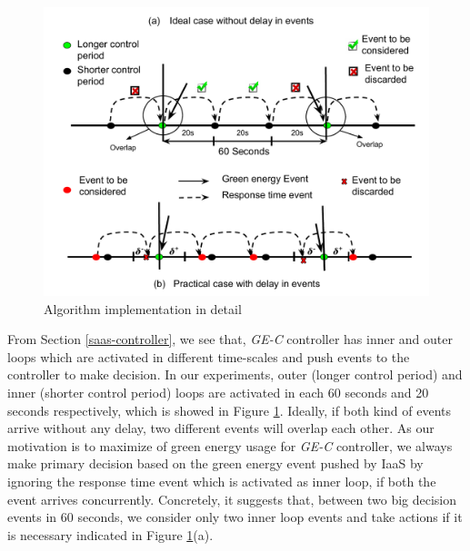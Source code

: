 \begin{figure} [htb]
\includegraphics[scale=.35]{Graphs/implementation_UCC.pdf}
\caption{Algorithm implementation in detail}
\label{fig:implementation} 
\end{figure}

From Section \ref{saas-controller}, we see that, \emph{GE-C} controller has inner and outer loops which are activated in different time-scales and push events to the controller to make decision. In our experiments, outer (longer control period) and inner (shorter control period) loops are activated in each 60 seconds and 20 seconds respectively, which is showed in Figure \ref{fig:implementation}. Ideally, if both kind of events arrive without any delay, two different events will overlap each other. As our motivation is to maximize of green energy usage for \emph{GE-C} controller, we always make primary decision based on the green energy event pushed by IaaS by ignoring the response time event which is activated as inner loop, if both the event arrives concurrently. Concretely, it suggests that, between two big decision events in 60 seconds, we consider only two inner loop events and take actions if it is necessary indicated in Figure \ref{fig:implementation}(a).

